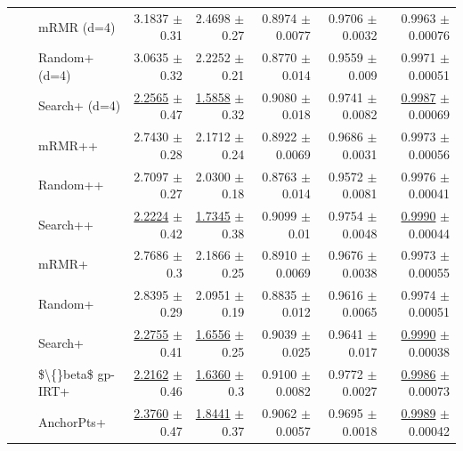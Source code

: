 \begin{longtable}{llp{}rrrrr}
 &  & mRMR (d=4) & 3.1837 {\scriptsize $\pm$ 0.31} & 2.4698 {\scriptsize $\pm$ 0.27} & 0.8974 {\scriptsize $\pm$ 0.0077} & 0.9706 {\scriptsize $\pm$ 0.0032} & 0.9963 {\scriptsize $\pm$ 0.00076} \\
 &  & Random+ (d=4) & 3.0635 {\scriptsize $\pm$ 0.32} & 2.2252 {\scriptsize $\pm$ 0.21} & 0.8770 {\scriptsize $\pm$ 0.014} & 0.9559 {\scriptsize $\pm$ 0.009} & 0.9971 {\scriptsize $\pm$ 0.00051} \\
 &  & Search+ (d=4) & \underline{2.2565} {\scriptsize $\pm$ 0.47} & \underline{1.5858} {\scriptsize $\pm$ 0.32} & 0.9080 {\scriptsize $\pm$ 0.018} & 0.9741 {\scriptsize $\pm$ 0.0082} & \underline{0.9987} {\scriptsize $\pm$ 0.00069} \\
 &  & mRMR++ & 2.7430 {\scriptsize $\pm$ 0.28} & 2.1712 {\scriptsize $\pm$ 0.24} & 0.8922 {\scriptsize $\pm$ 0.0069} & 0.9686 {\scriptsize $\pm$ 0.0031} & 0.9973 {\scriptsize $\pm$ 0.00056} \\
 &  & Random++ & 2.7097 {\scriptsize $\pm$ 0.27} & 2.0300 {\scriptsize $\pm$ 0.18} & 0.8763 {\scriptsize $\pm$ 0.014} & 0.9572 {\scriptsize $\pm$ 0.0081} & 0.9976 {\scriptsize $\pm$ 0.00041} \\
 &  & Search++ & \underline{2.2224} {\scriptsize $\pm$ 0.42} & \underline{1.7345} {\scriptsize $\pm$ 0.38} & 0.9099 {\scriptsize $\pm$ 0.01} & 0.9754 {\scriptsize $\pm$ 0.0048} & \underline{0.9990} {\scriptsize $\pm$ 0.00044} \\
 &  & mRMR+ & 2.7686 {\scriptsize $\pm$ 0.3} & 2.1866 {\scriptsize $\pm$ 0.25} & 0.8910 {\scriptsize $\pm$ 0.0069} & 0.9676 {\scriptsize $\pm$ 0.0038} & 0.9973 {\scriptsize $\pm$ 0.00055} \\
 &  & Random+ & 2.8395 {\scriptsize $\pm$ 0.29} & 2.0951 {\scriptsize $\pm$ 0.19} & 0.8835 {\scriptsize $\pm$ 0.012} & 0.9616 {\scriptsize $\pm$ 0.0065} & 0.9974 {\scriptsize $\pm$ 0.00051} \\
 &  & Search+ & \underline{2.2755} {\scriptsize $\pm$ 0.41} & \underline{1.6556} {\scriptsize $\pm$ 0.25} & 0.9039 {\scriptsize $\pm$ 0.025} & 0.9641 {\scriptsize $\pm$ 0.017} & \underline{0.9990} {\scriptsize $\pm$ 0.00038} \\
 &  & \$\textbackslash\{\}beta\$ gp-IRT+ & \underline{2.2162} {\scriptsize $\pm$ 0.46} & \underline{1.6360} {\scriptsize $\pm$ 0.3} & 0.9100 {\scriptsize $\pm$ 0.0082} & 0.9772 {\scriptsize $\pm$ 0.0027} & \underline{0.9986} {\scriptsize $\pm$ 0.00073} \\
 &  & AnchorPts+ & \underline{2.3760} {\scriptsize $\pm$ 0.47} & \underline{1.8441} {\scriptsize $\pm$ 0.37} & 0.9062 {\scriptsize $\pm$ 0.0057} & 0.9695 {\scriptsize $\pm$ 0.0018} & \underline{0.9989} {\scriptsize $\pm$ 0.00042} \\

\end{longtable}
